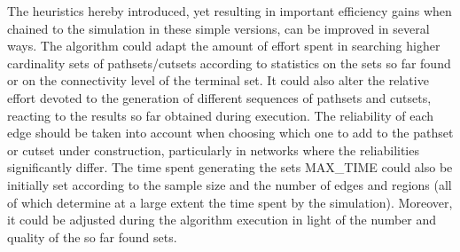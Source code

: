 \documentclass[a4paper]{article}
\begin{document}
The heuristics hereby introduced, yet resulting in important efficiency gains when chained to the simulation in these simple versions, can be improved in several ways. The algorithm could adapt the amount of effort spent in searching higher cardinality sets of pathsets/cutsets according to statistics on the sets so far found or on the connectivity level of the terminal set. It could also alter the relative effort devoted to the generation of different sequences of pathsets and cutsets, reacting to the results so far obtained during execution. The reliability of each edge should be taken into account when choosing which one to add to the pathset or cutset under construction, particularly in networks where the reliabilities significantly differ. The time spent generating the sets MAX\_TIME could also be initially set according to the sample size and the number of edges and regions (all of which determine at a large extent the time spent by the simulation). Moreover, it could be adjusted during the algorithm execution in light of the number and quality of the so far found sets.





















\tableofcontents
\end{document}
